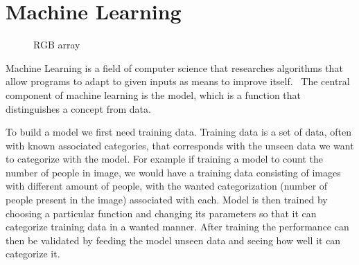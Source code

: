 \documentclass[12pt,a4paper,english
]{tunithesis}
\begin{document}
\section{Machine Learning}
\begin{figure}
  \centering
  \caption{RGB array}
  \label{fig:rgb-array}
\end{figure}

Machine Learning is a field of computer science that researches algorithms that allow programs to adapt to given inputs as means to improve itself.~\cite{mitchell1997machine}
The central component of machine learning is the model, which is a function that distinguishes a concept from data.

To build a model we first need training data. Training data is a set of data, often with known associated categories, that corresponds with the unseen data we want to categorize with the model. For example if training a model to count the number of people in image, we would have a training data consisting of images with different amount of people, with the wanted categorization (number of people present in the image) associated with each. Model is then trained by choosing a particular function and changing its parameters so that it can categorize training data in a wanted manner. After training the performance can then be validated by feeding the model unseen data and seeing how well it can categorize it.
\end{document}
